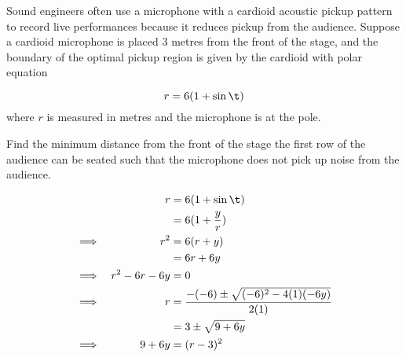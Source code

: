 \documentclass{echw}
\begin{document}

    \problem{}
        \begin{center}
        \end{center}

        Sound engineers often use a microphone with a cardioid acoustic pickup pattern to record live performances because it reduces pickup from the audience. Suppose a cardioid microphone is placed 3 metres from the front of the stage, and the boundary of the optimal pickup region is given by the cardioid with polar equation

        \[
            r = 6(1 + \sin \t)
        \]
        where $r$ is measured in metres and the microphone is at the pole.

        Find the minimum distance from the front of the stage the first row of the audience can be seated such that the microphone does not pick up noise from the audience.

    \solution
        \begin{alignat*}{2}
            &&r &= 6(1 + \sin\t)\\
            && &= 6(1 + \dfrac{y}{r})\\
            \implies&&r^2 &= 6(r + y)\\
            && &= 6r + 6y\\
            \implies&&r^2 - 6r - 6y &= 0\\
            \implies&&r &= \dfrac{-(-6) \pm \sqrt{(-6)^2 - 4(1)(-6y)}}{2(1)}\\
            && &= 3 \pm \sqrt{9 + 6y}\\
            \implies&&9 + 6y &= (r-3)^2
        \end{alignat*}
\end{document}
